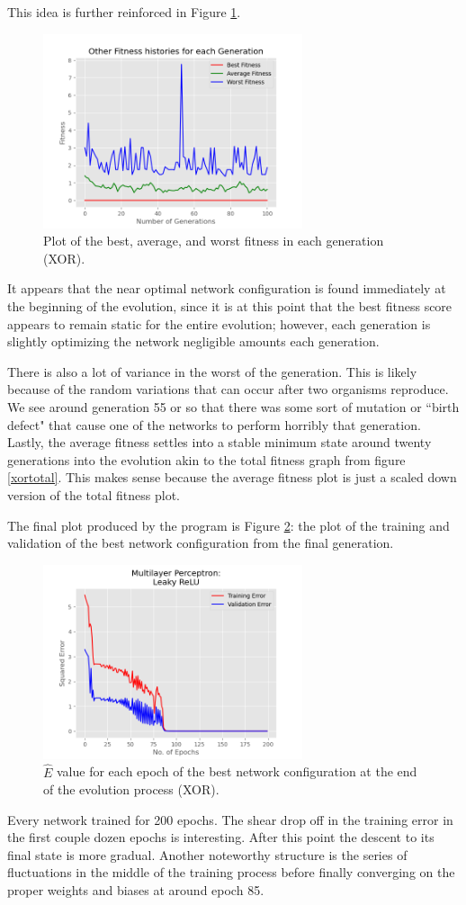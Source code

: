 \documentclass[12pt]{report}
\begin{document}
This idea is further reinforced in Figure \ref{xorfitness}.
\begin{figure}[hbt!]
    \centering
    \includegraphics[width=3in]{figures/12.png}
    \caption{Plot of the best, average, and worst fitness in each generation (XOR).}
    \label{xorfitness}
\end{figure}
It appears that the near optimal network configuration is found immediately at the beginning of the evolution, since it is at this point that the best fitness score appears to remain static for the entire evolution; however, each generation is slightly optimizing the network negligible amounts each generation.

There is also a lot of variance in the worst of the generation. This is likely because of the random variations that can occur after two organisms reproduce. We see around generation 55 or so that there was some sort of mutation or ``birth defect" that cause one of the networks to perform horribly that generation. Lastly, the average fitness settles into a stable minimum state around twenty generations into the evolution akin to the total fitness graph from figure \ref{xortotal}. This makes sense because the average fitness plot is just a scaled down version of the total fitness plot.

The final plot produced by the program is Figure \ref{xorerror}: the plot of the training and validation of the best network configuration from the final generation.
\begin{figure}[hbt!]
    \centering
    \includegraphics[width=3in]{figures/13.png}
    \caption{$\hat{E}$ value for each epoch of the best network configuration at the end of the evolution process (XOR).}
    \label{xorerror}
\end{figure}
Every network trained for 200 epochs. The shear drop off in the training error in the first couple dozen epochs is interesting. After this point the descent to its final state is more gradual. Another noteworthy structure is the series of fluctuations in the middle of the training process before finally converging on the proper weights and biases at around epoch 85.
\end{document}
